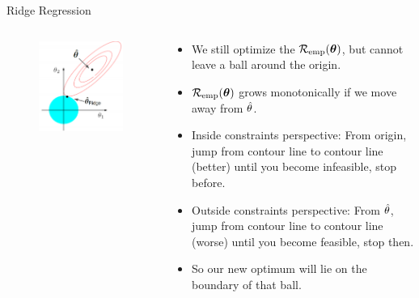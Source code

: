 \begin{vbframe}{Ridge Regression}
\framebreak

\begin{columns}
\begin{column}{0.5\textwidth}
\begin{figure}
\includegraphics[width=\textwidth]{figure_man/ridge_hat.png}
\end{figure}
\end{column}

\begin{column}{0.5\textwidth}
\begin{footnotesize}
\begin{itemize}
  \item We still optimize the $\mathcal{R}_{\text{emp}}(\bm{\theta})$, but cannot leave a ball around the origin.
  \item $\mathcal{R}_{\text{emp}}(\bm{\theta})$ grows monotonically if we move away from $\hat{\theta}$.
  \item Inside constraints perspective: From origin, jump from contour line to contour line (better) until you become infeasible, stop before.
\item Outside constraints perspective: From $\hat{\theta}$, jump from contour line to contour line (worse) until you become feasible, stop then.
  \item So our new optimum will lie on the boundary of that ball.
\end{itemize}
\end{footnotesize}
\end{column}
\end{columns}


\end{vbframe}



